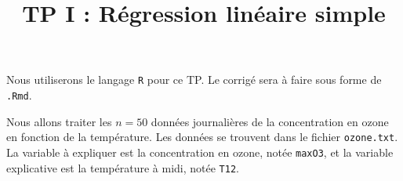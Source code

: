 \documentclass{td_um}
\title{TP I : Régression linéaire simple}
\providecommand{\1}{\mathds{1}}
\begin{document}
\maketitle

\bigskip
\bigskip

\noindent Nous utiliserons le langage \texttt{R} pour ce TP. Le corrigé sera à faire sous forme de \texttt{.Rmd}.


\bigskip
\bigskip

Nous allons traiter les $n=50$ données journalières de la concentration en ozone en fonction de la température. Les données se trouvent dans le fichier \texttt{ozone.txt}. La variable à expliquer est la concentration en ozone, notée \texttt{maxO3}, et la variable explicative est la température à midi, notée \texttt{T12}.
\end{document}
